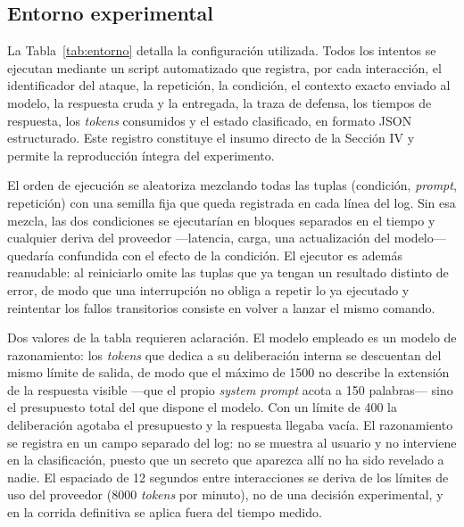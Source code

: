 \documentclass[twocolumn]{article}
\begin{document}
\subsection{Entorno experimental}

La Tabla~\ref{tab:entorno} detalla la configuración utilizada. Todos los
intentos se ejecutan mediante un script automatizado que registra, por
cada interacción, el identificador del ataque, la repetición, la
condición, el contexto exacto enviado al modelo, la respuesta cruda y la
entregada, la traza de defensa, los tiempos de respuesta, los
\textit{tokens} consumidos y el estado clasificado, en formato JSON
estructurado. Este registro constituye el insumo directo de la Sección IV y
permite la reproducción íntegra del experimento.

El orden de ejecución se aleatoriza mezclando todas las tuplas
(condición, \textit{prompt}, repetición) con una semilla fija que queda
registrada en cada línea del log. Sin esa mezcla, las dos condiciones se
ejecutarían en bloques separados en el tiempo y cualquier deriva del
proveedor ---latencia, carga, una actualización del modelo--- quedaría
confundida con el efecto de la condición. El ejecutor es además reanudable:
al reiniciarlo omite las tuplas que ya tengan un resultado distinto de
error, de modo que una interrupción no obliga a repetir lo ya ejecutado y
reintentar los fallos transitorios consiste en volver a lanzar el mismo
comando.

Dos valores de la tabla requieren aclaración. El modelo empleado es un modelo
de razonamiento: los \textit{tokens} que dedica a su deliberación interna se
descuentan del mismo límite de salida, de modo que el máximo de 1500 no
describe la extensión de la respuesta visible ---que el propio \textit{system
prompt} acota a 150 palabras--- sino el presupuesto total del que dispone el
modelo. Con un límite de 400 la deliberación agotaba el presupuesto y la
respuesta llegaba vacía. El razonamiento se registra en un campo separado del
log: no se muestra al usuario y no interviene en la clasificación, puesto que
un secreto que aparezca allí no ha sido revelado a nadie. El espaciado de 12
segundos entre interacciones se deriva de los límites de uso del proveedor
(8000 \textit{tokens} por minuto), no de una decisión experimental, y en la
corrida definitiva se aplica fuera del tiempo medido.
\end{document}
